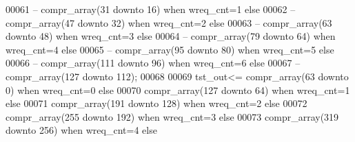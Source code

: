 \begin{DoxyCode}
00061 \textcolor{keyword}{--              compr\_array(31 downto 16) when wreq\_cnt=1 else}
00062 \textcolor{keyword}{--              compr\_array(47 downto 32) when wreq\_cnt=2 else}
00063 \textcolor{keyword}{--              compr\_array(63 downto 48) when wreq\_cnt=3 else}
00064 \textcolor{keyword}{--              compr\_array(79 downto 64) when wreq\_cnt=4 else}
00065 \textcolor{keyword}{--              compr\_array(95 downto 80) when wreq\_cnt=5 else}
00066 \textcolor{keyword}{--              compr\_array(111 downto 96) when wreq\_cnt=6 else}
00067 \textcolor{keyword}{--              compr\_array(127 downto 112);  }
00068 
00069   \textcolor{vhdlchar}{tst_out}\textcolor{vhdlchar}{<=} \textcolor{vhdlchar}{compr_array}\textcolor{vhdlchar}{(}\textcolor{vhdllogic}{}\textcolor{vhdllogic}{63} \textcolor{keywordflow}{downto} \textcolor{vhdllogic}{}\textcolor{vhdllogic}{0}\textcolor{vhdlchar}{)} \textcolor{keywordflow}{when} \textcolor{vhdlchar}{wreq_cnt}\textcolor{vhdlchar}{=}\textcolor{vhdllogic}{}\textcolor{vhdllogic}{0} \textcolor{keywordflow}{else} 
00070           \textcolor{vhdlchar}{compr_array}\textcolor{vhdlchar}{(}\textcolor{vhdllogic}{}\textcolor{vhdllogic}{127} \textcolor{keywordflow}{downto} \textcolor{vhdllogic}{}\textcolor{vhdllogic}{64}\textcolor{vhdlchar}{)} \textcolor{keywordflow}{when} \textcolor{vhdlchar}{wreq_cnt}\textcolor{vhdlchar}{=}\textcolor{vhdllogic}{}\textcolor{vhdllogic}{1} \textcolor{keywordflow}{else}
00071           \textcolor{vhdlchar}{compr_array}\textcolor{vhdlchar}{(}\textcolor{vhdllogic}{}\textcolor{vhdllogic}{191} \textcolor{keywordflow}{downto} \textcolor{vhdllogic}{}\textcolor{vhdllogic}{128}\textcolor{vhdlchar}{)} \textcolor{keywordflow}{when} \textcolor{vhdlchar}{wreq_cnt}\textcolor{vhdlchar}{=}\textcolor{vhdllogic}{}\textcolor{vhdllogic}{2} \textcolor{keywordflow}{else}
00072                 \textcolor{vhdlchar}{compr_array}\textcolor{vhdlchar}{(}\textcolor{vhdllogic}{}\textcolor{vhdllogic}{255} \textcolor{keywordflow}{downto} \textcolor{vhdllogic}{}\textcolor{vhdllogic}{192}\textcolor{vhdlchar}{)} \textcolor{keywordflow}{when} \textcolor{vhdlchar}{wreq_cnt}\textcolor{vhdlchar}{=}\textcolor{vhdllogic}{}\textcolor{vhdllogic}{3} \textcolor{keywordflow}{else}
00073                 \textcolor{vhdlchar}{compr_array}\textcolor{vhdlchar}{(}\textcolor{vhdllogic}{}\textcolor{vhdllogic}{319} \textcolor{keywordflow}{downto} \textcolor{vhdllogic}{}\textcolor{vhdllogic}{256}\textcolor{vhdlchar}{)} \textcolor{keywordflow}{when} \textcolor{vhdlchar}{wreq_cnt}\textcolor{vhdlchar}{=}\textcolor{vhdllogic}{}\textcolor{vhdllogic}{4} \textcolor{keywordflow}{else}

\end{DoxyCode}
